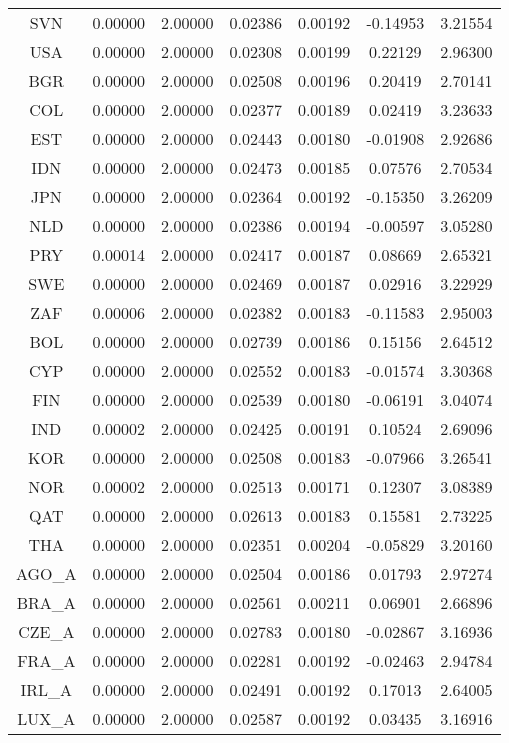 \begin{longtable}{c c c c c c c}
SVN & 0.00000 & 2.00000 & 0.02386 & 0.00192 & -0.14953 & 3.21554 \\
USA & 0.00000 & 2.00000 & 0.02308 & 0.00199 & 0.22129 & 2.96300 \\
BGR & 0.00000 & 2.00000 & 0.02508 & 0.00196 & 0.20419 & 2.70141 \\
COL & 0.00000 & 2.00000 & 0.02377 & 0.00189 & 0.02419 & 3.23633 \\
EST & 0.00000 & 2.00000 & 0.02443 & 0.00180 & -0.01908 & 2.92686 \\
IDN & 0.00000 & 2.00000 & 0.02473 & 0.00185 & 0.07576 & 2.70534 \\
JPN & 0.00000 & 2.00000 & 0.02364 & 0.00192 & -0.15350 & 3.26209 \\
NLD & 0.00000 & 2.00000 & 0.02386 & 0.00194 & -0.00597 & 3.05280 \\
PRY & 0.00014 & 2.00000 & 0.02417 & 0.00187 & 0.08669 & 2.65321 \\
SWE & 0.00000 & 2.00000 & 0.02469 & 0.00187 & 0.02916 & 3.22929 \\
ZAF & 0.00006 & 2.00000 & 0.02382 & 0.00183 & -0.11583 & 2.95003 \\
BOL & 0.00000 & 2.00000 & 0.02739 & 0.00186 & 0.15156 & 2.64512 \\
CYP & 0.00000 & 2.00000 & 0.02552 & 0.00183 & -0.01574 & 3.30368 \\
FIN & 0.00000 & 2.00000 & 0.02539 & 0.00180 & -0.06191 & 3.04074 \\
IND & 0.00002 & 2.00000 & 0.02425 & 0.00191 & 0.10524 & 2.69096 \\
KOR & 0.00000 & 2.00000 & 0.02508 & 0.00183 & -0.07966 & 3.26541 \\
NOR & 0.00002 & 2.00000 & 0.02513 & 0.00171 & 0.12307 & 3.08389 \\
QAT & 0.00000 & 2.00000 & 0.02613 & 0.00183 & 0.15581 & 2.73225 \\
THA & 0.00000 & 2.00000 & 0.02351 & 0.00204 & -0.05829 & 3.20160 \\
AGO_A & 0.00000 & 2.00000 & 0.02504 & 0.00186 & 0.01793 & 2.97274 \\
BRA_A & 0.00000 & 2.00000 & 0.02561 & 0.00211 & 0.06901 & 2.66896 \\
CZE_A & 0.00000 & 2.00000 & 0.02783 & 0.00180 & -0.02867 & 3.16936 \\
FRA_A & 0.00000 & 2.00000 & 0.02281 & 0.00192 & -0.02463 & 2.94784 \\
IRL_A & 0.00000 & 2.00000 & 0.02491 & 0.00192 & 0.17013 & 2.64005 \\
LUX_A & 0.00000 & 2.00000 & 0.02587 & 0.00192 & 0.03435 & 3.16916 \\

\end{longtable}
